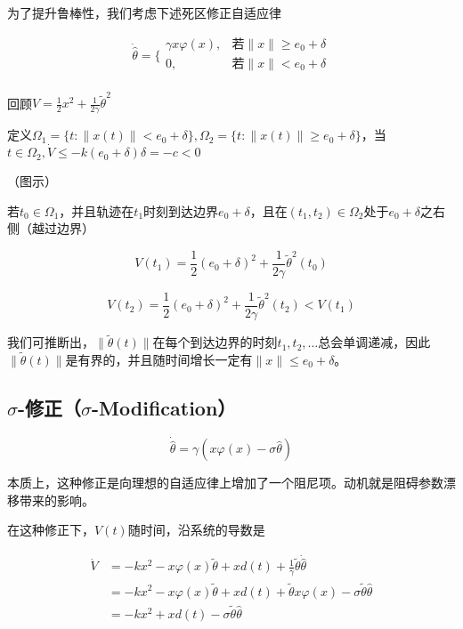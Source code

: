 为了提升鲁棒性，我们考虑下述死区修正自适应律

\[\dot{\hat{\theta}} = \{\begin{matrix}
\gamma x\varphi(x), & \text{若} \parallel x \parallel \geq e_{0} + \delta \\
0, & \text{若} \parallel x \parallel < e_{0} + \delta \\
\end{matrix}\]

回顾\(V = \frac{1}{2}x^{2} + \frac{1}{2\gamma}{\tilde{\theta}}^{2}\)

定义\(\Omega_{1} = \{ t: \parallel x(t) \parallel < e_{0} + \delta\},\Omega_{2} = \{ t: \parallel x(t) \parallel \geq e_{0} + \delta\}\)，当\(t \in \Omega_{2},\dot{V} \leq - k(e_{0} + \delta)\delta = - c < 0\)

（图示）

若\(t_{0} \in \Omega_{1}\)，并且轨迹在\(t_{1}\)时刻到达边界\(e_{0} + \delta\)，且在\((t_{1},t_{2}) \in \Omega_{2}\)处于\(e_{0} + \delta\)之右侧（越过边界）

\[V(t_{1}) = \frac{1}{2}(e_{0} + \delta)^{2} + \frac{1}{2\gamma}{\tilde{\theta}}^{2}(t_{0})\]

\[V(t_{2}) = \frac{1}{2}(e_{0} + \delta)^{2} + \frac{1}{2\gamma}{\tilde{\theta}}^{2}(t_{2}) < V(t_{1})\]

我们可推断出，\(\parallel \tilde{\theta}(t) \parallel\)在每个到达边界的时刻\(t_{1},t_{2},\ldots\)总会单调递减，因此\(\parallel \tilde{\theta}(t) \parallel\)是有界的，并且随时间增长一定有\(\parallel x \parallel \leq e_{0} + \delta\)。

\subsection{\texorpdfstring{$\sigma$-修正（$\sigma$-Modification）}{σ-修正（σ-Modification）}}

\[\dot{\hat{\theta}} = \gamma(x\varphi(x) - \sigma\hat{\theta})\]

本质上，这种修正是向理想的自适应律上增加了一个阻尼项。动机就是阻碍参数漂移带来的影响。

在这种修正下，\(V(t)\)随时间，沿系统的导数是

\[\begin{matrix}
\dot{V} & = - kx^{2} - x\varphi(x)\tilde{\theta} + xd(t) + \frac{1}{\gamma}\tilde{\theta}\dot{\hat{\theta}} \\
 & = - kx^{2} - x\varphi(x)\tilde{\theta} + xd(t) + \tilde{\theta}x\varphi(x) - \sigma\tilde{\theta}\hat{\theta} \\
 & = - kx^{2} + xd(t) - \sigma\tilde{\theta}\hat{\theta} \\
\end{matrix}\]

